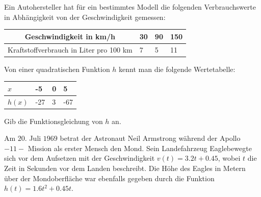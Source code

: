 \documentclass[11pt]{exam}
\begin{document}
\begin{questions}
\noaddpoints
\question[\totalpoints] %
\addpoints
Ein Autohersteller hat für ein bestimmtes Modell die folgenden Verbrauchswerte in Abhängigkeit von der Geschwindigkeit gemessen:
\begingroup
\renewcommand{\arraystretch}{1.5}
\begin{table}[H]
    \centering
    \begin{tabular}{|c|p{1cm}|p{1cm}|p{1cm}|}\hline
        Geschwindigkeit in km/h & 30 & 90 & 150 \\\hline
        Kraftstoffverbrauch in Liter pro 100 km & 7 & 5 & 11 \\\hline
    \end{tabular}
\end{table}
\endgroup
{}


\noaddpoints
\question[\totalpoints] %
\addpoints
Von einer quadratischen Funktion $h$ kennt man die folgende Wertetabelle:
\begingroup
\renewcommand{\arraystretch}{1.5}
\begin{table}[H]
	\centering
	\begin{tabular}{|p{1cm}|p{1cm}|p{1cm}|p{1cm}|}\hline
		$x$ & -5 & 0 & 5 \\\hline
		$h(x)$ & -27 & 3 & -67 \\\hline
	\end{tabular}
\end{table}
\endgroup
Gib die Funktionsgleichung von $h$ an.


\noaddpoints
\question[\totalpoints] %
\addpoints
Am $20.$ Juli $1969$ betrat der Astronaut Neil Armstrong während der Apollo$-11-$ Mission als erster Mensch den Mond. Sein Landefahrzeug \flqq Eagle\frqq bewegte sich vor dem Aufsetzen mit der Geschwindigkeit $v(t)=3.2t+0.45$, wobei $t$ die Zeit in Sekunden vor dem Landen beschreibt. Die Höhe des Eagles in Metern über der Mondoberfläche war ebenfalls gegeben durch die Funktion $h(t)=1.6t^2+0.45t$.
\begin{parts}

\end{parts}
\end{questions}
\end{document}
